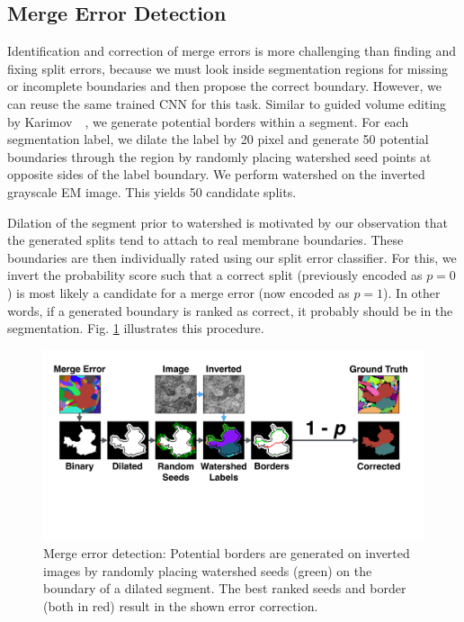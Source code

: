 \subsection{Merge Error Detection}

Identification and correction of merge errors is more challenging than finding and fixing split errors, because we must look inside segmentation regions for missing or incomplete boundaries and then propose the correct boundary. However, we can reuse the same trained CNN for this task. Similar to guided volume editing by Karimov~\etal~\cite{karimov_guided_volume_editing}, we generate potential borders within a segment. For each segmentation label, we dilate the label by 20 pixel and generate 50 potential boundaries through the region by randomly placing watershed seed points at opposite sides of the label boundary. We perform watershed on the inverted grayscale EM image. This yields 50 candidate splits.

Dilation of the segment prior to watershed is motivated by our observation that the generated splits tend to attach to real membrane boundaries. These boundaries are then individually rated using our split error classifier. For this, we invert the probability score such that a correct split (previously encoded as $p=0$) is most likely a candidate for a merge error (now encoded as $p=1$). In other words, if a generated boundary is ranked as correct, it probably should be in the segmentation. Fig. \ref{fig:merge_error} illustrates this procedure.

\begin{figure}[t]
\centering
\includegraphics[width=\linewidth]{gfx/merge_error_v6.pdf}
\caption{Merge error detection: Potential borders are generated on inverted images by randomly placing watershed seeds (green) on the boundary of a dilated segment. The best ranked seeds and border (both in red) result in the shown error correction.}
\label{fig:merge_error}
\end{figure}

